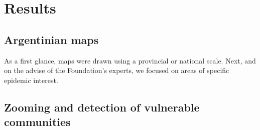\section{Results}

\subsection{Argentinian maps}
As a first glance, maps were drawn using a provincial or national scale.
Next, and on the advise of the Foundation's experts, we focused on areas of specific epidemic interest.
\subsection{Zooming and detection of vulnerable communities}

